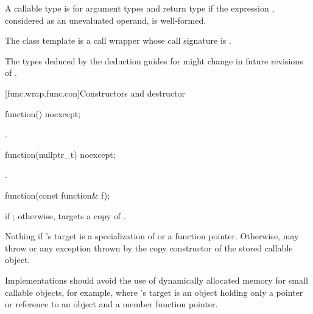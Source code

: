 \pnum
{}%
A callable type 
is  for argument
types 
and return type 
if the expression
,
considered as an unevaluated operand, is
well-formed.

\pnum
The  class template is a call
wrapper whose call signature
is .

\pnum
\begin{note}
The types deduced by the deduction guides for 
might change in future revisions of \Cpp{}.
\end{note}

[func.wrap.func.con]{Constructors and destructor}

%
\begin{itemdecl}
function() noexcept;
\end{itemdecl}

\begin{itemdescr}
\pnum
\ensures
{}.
\end{itemdescr}

%
\begin{itemdecl}
function(nullptr_t) noexcept;
\end{itemdecl}

\begin{itemdescr}
\pnum
\ensures
{}.
\end{itemdescr}

%
\begin{itemdecl}
function(const function& f);
\end{itemdecl}

\begin{itemdescr}
\pnum
\ensures
{} if ; otherwise,
 targets a copy of .

\pnum
\throws
Nothing if 's target is
a specialization of  or
a function pointer. Otherwise, may throw 
or any exception thrown by the copy constructor of the stored callable object.

\pnum
\recommended
Implementations should avoid the use of
dynamically allocated memory for small callable objects, for example, where
's target is an object holding only a pointer or reference
to an object and a member function pointer.
\end{itemdescr}

